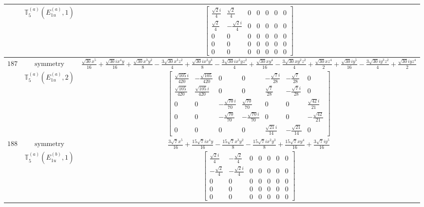 \documentclass[fleqn,8pt,landscape]{jsarticle}
\begin{document}
\begin{longtable}{ccc}
$  $ & $ \mathbb{T}_{5}^{(a)}(E_{1u}^{(a)},1) $ & $ \begin{bmatrix} \frac{\sqrt{2} i}{4} & \frac{\sqrt{2}}{4} & 0 & 0 & 0 & 0 & 0 \\ \frac{\sqrt{2}}{4} & - \frac{\sqrt{2} i}{4} & 0 & 0 & 0 & 0 & 0 \\ 0 & 0 & 0 & 0 & 0 & 0 & 0 \\ 0 & 0 & 0 & 0 & 0 & 0 & 0 \\ 0 & 0 & 0 & 0 & 0 & 0 & 0 \end{bmatrix} $ \\ \hline
$ 187 $ & $ \text{symmetry} $ & $ \frac{\sqrt{30} x^{5}}{16} + \frac{\sqrt{30} i x^{4} y}{16} + \frac{\sqrt{30} x^{3} y^{2}}{8} - \frac{3 \sqrt{30} x^{3} z^{2}}{4} + \frac{\sqrt{30} i x^{2} y^{3}}{8} - \frac{3 \sqrt{30} i x^{2} y z^{2}}{4} + \frac{\sqrt{30} x y^{4}}{16} - \frac{3 \sqrt{30} x y^{2} z^{2}}{4} + \frac{\sqrt{30} x z^{4}}{2} + \frac{\sqrt{30} i y^{5}}{16} - \frac{3 \sqrt{30} i y^{3} z^{2}}{4} + \frac{\sqrt{30} i y z^{4}}{2} $ \\
$  $ & $ \mathbb{T}_{5}^{(a)}(E_{1u}^{(a)},2) $ & $ \begin{bmatrix} \frac{\sqrt{105} i}{420} & - \frac{\sqrt{105}}{420} & 0 & 0 & - \frac{\sqrt{7} i}{28} & - \frac{\sqrt{7}}{28} & 0 \\ \frac{\sqrt{105}}{420} & \frac{\sqrt{105} i}{420} & 0 & 0 & \frac{\sqrt{7}}{28} & - \frac{\sqrt{7} i}{28} & 0 \\ 0 & 0 & - \frac{\sqrt{70} i}{70} & \frac{\sqrt{70}}{70} & 0 & 0 & \frac{\sqrt{42} i}{21} \\ 0 & 0 & - \frac{\sqrt{70}}{70} & - \frac{\sqrt{70} i}{70} & 0 & 0 & - \frac{\sqrt{42}}{21} \\ 0 & 0 & 0 & 0 & \frac{\sqrt{21} i}{14} & - \frac{\sqrt{21}}{14} & 0 \end{bmatrix} $ \\ \hline
$ 188 $ & $ \text{symmetry} $ & $ \frac{3 \sqrt{7} x^{5}}{16} + \frac{15 \sqrt{7} i x^{4} y}{16} - \frac{15 \sqrt{7} x^{3} y^{2}}{8} - \frac{15 \sqrt{7} i x^{2} y^{3}}{8} + \frac{15 \sqrt{7} x y^{4}}{16} + \frac{3 \sqrt{7} i y^{5}}{16} $ \\
$  $ & $ \mathbb{T}_{5}^{(a)}(E_{1u}^{(b)},1) $ & $ \begin{bmatrix} \frac{\sqrt{2} i}{4} & - \frac{\sqrt{2}}{4} & 0 & 0 & 0 & 0 & 0 \\ - \frac{\sqrt{2}}{4} & - \frac{\sqrt{2} i}{4} & 0 & 0 & 0 & 0 & 0 \\ 0 & 0 & 0 & 0 & 0 & 0 & 0 \\ 0 & 0 & 0 & 0 & 0 & 0 & 0 \\ 0 & 0 & 0 & 0 & 0 & 0 & 0 \end{bmatrix} $ \\ \hline

\end{longtable}
\end{document}
